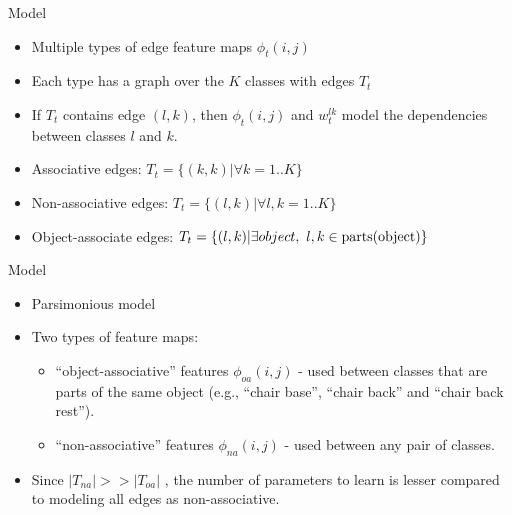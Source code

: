 \documentclass{beamer}
\newcommand{\fe}[3]{{\phi_{#1}(#2,#3)}}%
\newcommand{\we}[3]{{w_{#1}^{#2#3}}}   %
\begin{document}
\begin{frame}{Model}

\begin{itemize}

\item Multiple types of edge feature maps $\fe{t}{i}{j}$
\item Each type has a graph over the $K$ classes with edges  $T_t$
\item If $T_t$ contains edge $(l,k)$, then $\fe{t}{i}{j}$ and $\we{t}{l}{k}$  model the dependencies between classes $l$ and $k$.
\item Associative edges:  ${T_t}=\{(k,k)| \forall k=1..K\}$
\item Non-associative edges: $T_t=\{(l,k)| \forall l,k=1..K\}$
\item Object-associate edges: $T_t=\{(l,k) | \exists object , ~ l,k\in {\rm parts}({\rm object})\}$

\end{itemize}
\end{frame}

\begin{frame}{Model}
\begin{itemize}
\item Parsimonious model

\item Two types of feature maps: 
\begin{itemize}
\item ``object-associative'' features $\fe{oa}{i}{j}$ - used between classes that are parts of the same object (e.g., ``chair base'', ``chair back'' and ``chair back rest''). 
\item ``non-associative'' features $\fe{na}{i}{j}$ -  used between any pair of classes.
\end{itemize}
\item Since $|T_{na}| >> |T_{oa}|$ , the number of parameters to learn is lesser compared to modeling all edges as non-associative.
\end{itemize}
\end{frame}
\end{document}
